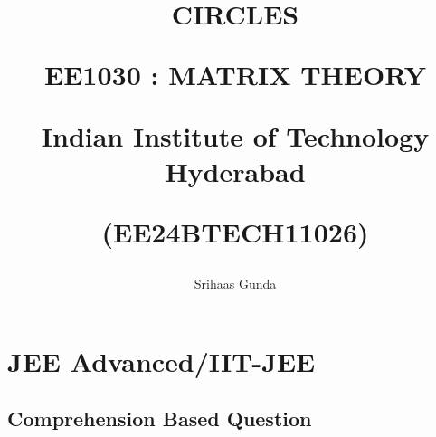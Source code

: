 \documentclass[journal]{IEEEtran}
\numberwithin{equation}{enumi}
\numberwithin{figure}{enumi}
\begin{document}
%






\title{
CIRCLES

\large{EE1030 : MATRIX THEORY}

Indian Institute of Technology Hyderabad

\author{Srihaas Gunda}

(EE24BTECH11026)
}

{\let\newpage\relax\maketitle}

\section{JEE Advanced/IIT-JEE}
\subsection{Comprehension Based Question}
\end{document}
